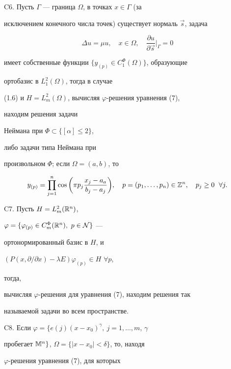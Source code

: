 C6. Пусть $\Gamma$ --- граница $\Omega$, в точках $x\in\Gamma$ (за 


исключением конечного числа точек) существует нормаль $\Vec s$, задача 


$$ 


\Delta u=\mu u,\quad x\in\Omega,\quad 


\frac{\partial u}{\partial\Vec s}\Big|_\Gamma=0 


$$ 


имеет собственные функции $\{y_{(p)}\in C^\Phi_1(\Omega)\}$, образующие 


ортобазис в $L^2_1(\Omega)$, тогда в случае 


(1.6) и $H=L^2_m(\Omega)$, вычисляя $\varphi$-решения уравнения (7), 


находим решения задачи 


Неймана при $\Phi\subset\{[\alpha]\le 2\}$, 


либо задачи типа Неймана при 


произвольном $\Phi$; если $\Omega=(a,b)$, то 


$$ 


y_{(p)}=\prod^n_{j=1}\cos\bigg(\pi p_j 


\frac{x_j-a_a}{b_j-a_j}\bigg),\quad 


p=(p_1,\dotsc,p_n)\in\Bbb Z^n,\quad 


p_j\ge 0\ \;\forall j. 


$$ 


 


C7. Пусть $H=L^2_m(\Bbb R^n)$, 


$\varphi=\{\varphi_{(p)}\in C^\Phi_m(\Bbb R^n),\ p\in\cal N\}$ --- 


ортонормированный базис в $H$, и 


$(P(x,\partial/\partial x)-\lambda E)\varphi_{(p)}\in H$ $\forall p$, 


тогда, 


вычисляя $\varphi$-решения для уравнения (7), находим решения так 


называемой задачи во всем пространстве. 


\medskip 


 


C8. Если $\varphi=\{e(j)(x-x_0)^\gamma,\ j=1,\dotsc,m$, $\gamma$ 


пробегает $\Bbb M^n\}$, $\Omega=\{|x-x_0|<\delta\}$, то, находя 


$\varphi$-решения уравнения (7), для которых 


